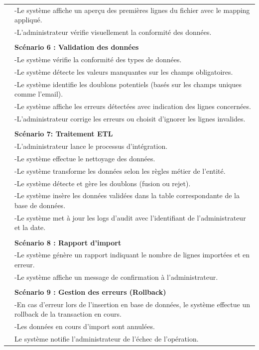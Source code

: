 \begin{longtable}{|l|p{12cm}|}
&-Le système affiche un aperçu des premières lignes du fichier avec le mapping appliqué. \\
&-L'administrateur vérifie visuellement la conformité des données. \\
\\
& \textbf{Scénario 6 : Validation des données} \\
&-Le système vérifie la conformité des types de données. \\
&-Le système détecte les valeurs manquantes sur les champs obligatoires. \\
&-Le système identifie les doublons potentiels (basés sur les champs uniques comme l'email). \\
&-Le système affiche les erreurs détectées avec indication des lignes concernées. \\
&-L'administrateur corrige les erreurs ou choisit d'ignorer les lignes invalides. \\
\\
& \textbf{Scénario 7: Traitement ETL} \\
&-L'administrateur lance le processus d'intégration. \\
&-Le système effectue le nettoyage des données. \\
&-Le système transforme les données selon les règles métier de l'entité. \\
&-Le système détecte et gère les doublons (fusion ou rejet). \\
&-Le système insère les données validées dans la table correspondante de la base de données. \\
&-Le système met à jour les logs d'audit avec l'identifiant de l'administrateur et la date. \\
\\
& \textbf{Scénario 8 : Rapport d'import} \\
&-Le système génère un rapport indiquant le nombre de lignes importées et en erreur. \\
&-Le système affiche un message de confirmation à l'administrateur. \\
\\
& \textbf{Scénario 9 : Gestion des erreurs (Rollback)} \\
&-En cas d'erreur lors de l'insertion en base de données, le système effectue un rollback de la transaction en cours. \\
&-Les données en cours d'import sont annulées. \\
& Le système notifie l'administrateur de l'échec de l'opération. \\

\end{longtable}

